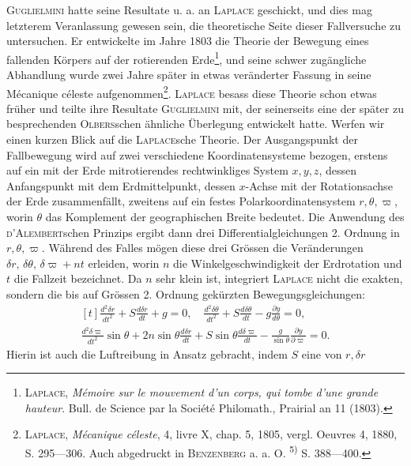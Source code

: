 \textsc{Guglielmini} hatte seine Resultate u. a. an \textsc{Laplace} geschickt, und dies
mag letzterem Veranlassung gewesen sein, die theoretische Seite dieser Fallversuche
zu untersuchen. Er entwickelte im Jahre 1803 die Theorie der
Bewegung eines fallenden Körpers auf der rotierenden Erde\footnote{\textsc{Laplace}, \textit{Mémoire sur le mouvement d’un corps, qui tombe d’une grande hauteur}. Bull. de
Science par la Société Philomath., Prairial an 11 (1803).}, und seine
schwer zugängliche Abhandlung wurde zwei Jahre später in etwas veränderter
Fassung in seine Mécanique céleste aufgenommen\footnote{\textsc{Laplace}, \textit{Mécanique céleste}, 4, livre X, chap. 5, 1805, vergl. Oeuvres 4, 1880, S. 295—306. Auch
abgedruckt in \textsc{Benzenberg} a. a. O. \textsuperscript{5)} S. 388—400.}. \textsc{Laplace} besass diese Theorie
schon etwas früher und teilte ihre Resultate \textsc{Guglielmini} mit, der seinerseits
eine der später zu besprechenden \textsc{Olbers}schen ähnliche Überlegung entwickelt
hatte. Werfen wir einen kurzen Blick auf die \textsc{Laplace}sche Theorie. Der
Ausgangspunkt der Fallbewegung wird auf zwei verschiedene Koordinatensysteme
bezogen, erstens auf ein mit der Erde mitrotierendes rechtwinkliges System
$x,y,z$, dessen Anfangspunkt mit dem Erdmittelpunkt, dessen $x$-Achse mit
\clearpage{}
\noindent der Rotationsachse der Erde zusammenfällt, zweitens auf ein festes Polarkoordinatensystem
$r,\theta,\varpi$, worin $\theta$ das Komplement der geographischen Breite bedeutet.
Die Anwendung des \textsc{d’Alembert}schen Prinzips ergibt dann drei Differentialgleichungen
2. Ordnung in $r,\theta,\varpi$. Während des Falles mögen diese
drei Grössen die Veränderungen $\delta r,\,\delta\theta,\,\delta\varpi+nt$ erleiden, worin $n$ die Winkelgeschwindigkeit
der Erdrotation und $t$ die Fallzeit bezeichnet. Da $n$ sehr
klein ist, integriert \textsc{Laplace} nicht die exakten, sondern die bis auf Grössen
2. Ordnung gekürzten Bewegungsgleichungen:
\[
\begin{gathered}[t]
\frac{d^2\delta r}{dt^2}+S\frac{d\delta r}{dt}+g=0,\quad
\frac{d^2\delta\theta}{dt^2}+S\frac{d\delta\theta}{dt}-g\frac{\partial y}{d\theta}=0,\\[5pt]
\frac{d^2\delta\varpi}{dt^2}\sin\theta+2n\sin\theta\frac{d\delta r}{dt}
+S\sin\theta\frac{d\delta\varpi}{dt}-\frac{g}{\sin\theta}\frac{\partial y}{\partial\varpi}=0.
\end{gathered}\tag{1}
\]
\noindent Hierin ist auch die Luftreibung in Ansatz gebracht, indem $S$ eine von $r,\delta r$
